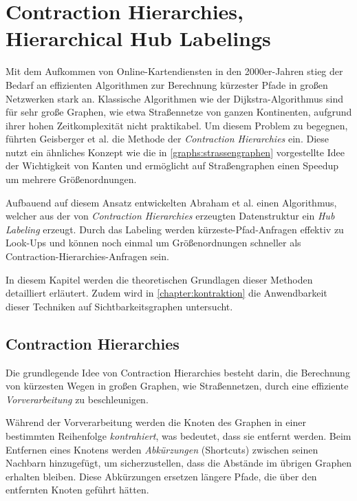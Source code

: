 \chapter{Contraction Hierarchies, Hierarchical Hub Labelings}\label{chapter:ch}

Mit dem Aufkommen von Online-Kartendiensten in den 2000er-Jahren stieg der Bedarf an effizienten Algorithmen zur Berechnung kürzester Pfade in großen Netzwerken stark an.
Klassische Algorithmen wie der Dijkstra-Algorithmus sind für sehr große Graphen, wie etwa Straßennetze von ganzen Kontinenten, aufgrund ihrer hohen Zeitkomplexität nicht praktikabel.
Um diesem Problem zu begegnen, führten Geisberger et al. \cite{geisberger2008contraction} die Methode der \emph{Contraction Hierarchies} ein.
Diese nutzt ein ähnliches Konzept wie die in \autoref{graphs:strassengraphen} vorgestellte Idee der Wichtigkeit von Kanten und ermöglicht auf Straßengraphen einen Speedup um mehrere Größenordnungen.

Aufbauend auf diesem Ansatz entwickelten Abraham et al. \cite{abraham2011hub} einen Algorithmus, welcher aus der von \emph{Contraction Hierarchies} erzeugten Datenstruktur ein \emph{Hub Labeling} erzeugt.
Durch das Labeling werden kürzeste-Pfad-Anfragen effektiv zu Look-Ups und können noch einmal um Größenordnungen schneller als Contraction-Hierarchies-Anfragen sein.

In diesem Kapitel werden die theoretischen Grundlagen dieser Methoden detailliert erläutert.
Zudem wird in \autoref{chapter:kontraktion}  die Anwendbarkeit dieser Techniken auf Sichtbarkeitsgraphen untersucht.

\section{Contraction Hierarchies}

Die grundlegende Idee von Contraction Hierarchies besteht darin, die Berechnung von kürzesten Wegen in großen Graphen, wie Straßennetzen, durch eine effiziente \emph{Vorverarbeitung} zu beschleunigen.

Während der Vorverarbeitung werden die Knoten des Graphen in einer bestimmten Reihenfolge \emph{kontrahiert}, was bedeutet, dass sie entfernt werden.
Beim Entfernen eines Knotens werden \emph{Abkürzungen} (Shortcuts) zwischen seinen Nachbarn hinzugefügt, um sicherzustellen, dass die Abstände im übrigen Graphen erhalten bleiben.
Diese Abkürzungen ersetzen längere Pfade, die über den entfernten Knoten geführt hätten.

